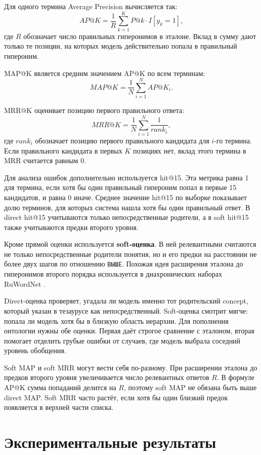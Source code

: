 \documentclass[12pt,a4paper,oneside,openany]{report}
\begin{document}
Для одного термина Average Precision вычисляется так:
\[
AP@K = \frac{1}{R}\sum_{k=1}^{K} P@k \cdot I[y_k = 1],
\]
где $R$ обозначает число правильных гиперонимов в эталоне. Вклад в сумму дают только те позиции, на которых модель действительно попала в правильный гипероним.

MAP@K является средним значением AP@K по всем терминам:
\[
MAP@K = \frac{1}{N}\sum_{i=1}^{N} AP@K_i.
\]

MRR@K оценивает позицию первого правильного ответа:
\[
MRR@K = \frac{1}{N}\sum_{i=1}^{N} \frac{1}{rank_i},
\]
где $rank_i$ обозначает позицию первого правильного кандидата для $i$-го термина. Если правильного кандидата в первых $K$ позициях нет, вклад этого термина в MRR считается равным 0.

Для анализа ошибок дополнительно используется hit@15. Эта метрика равна 1 для термина, если хотя бы один правильный гипероним попал в первые 15 кандидатов, и равна 0 иначе. Среднее значение hit@15 по выборке показывает долю терминов, для которых система нашла хотя бы один правильный ответ. В direct hit@15 учитываются только непосредственные родители, а в soft hit@15 также учитываются предки второго уровня.

Кроме прямой оценки используется \textbf{soft-оценка}. В ней релевантными считаются не только непосредственные родители понятия, но и его предки на расстоянии не более двух шагов по отношению \texttt{ВЫШЕ}. Похожая идея расширения эталона до гиперонимов второго порядка используется в диахронических наборах RuWordNet \cite{rcai2025}.

Direct-оценка проверяет, угадала ли модель именно тот родительский concept, который указан в тезаурусе как непосредственный. Soft-оценка смотрит мягче: попала ли модель хотя бы в близкую область иерархии. Для пополнения онтологии нужны обе оценки. Первая даёт строгое сравнение с эталоном, вторая помогает отделить грубые ошибки от случаев, где модель выбрала соседний уровень обобщения.

Soft MAP и soft MRR могут вести себя по-разному. При расширении эталона до предков второго уровня увеличивается число релевантных ответов $R$. В формуле AP@K сумма попаданий делится на $R$, поэтому soft MAP не обязана быть выше direct MAP. Soft MRR часто растёт, если хотя бы один близкий предок появляется в верхней части списка.

\chapter{Экспериментальные результаты}
\end{document}
